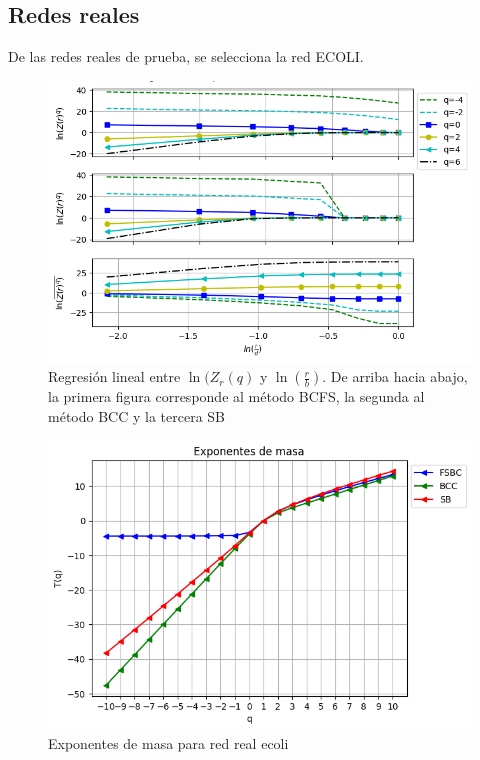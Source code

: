 \subsection{Redes reales}

De las redes reales de prueba, se selecciona la red ECOLI.

\begin{figure}[H]
    \centering
    \includegraphics[scale=0.7]{Capitulo4Multifractalidad/imagenes/a_TqLnrBCecoli.png}
    \caption{Regresión lineal entre $\ln(Z_r(q)$ y $\ln(\frac{r}{b})$. De arriba hacia abajo, la primera figura corresponde al método BCFS, la segunda al método BCC y la tercera SB}
\end{figure}

\begin{figure}[H]
    \centering
    \includegraphics[scale=0.7]{Capitulo4Multifractalidad/imagenes/a_Tqecoli.png}
    \caption{Exponentes de masa para red real ecoli}
\end{figure}

